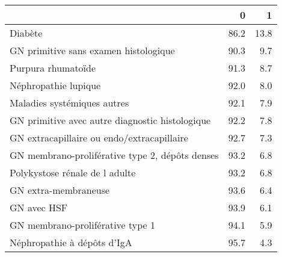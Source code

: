 \documentclass[11pt,a4paper]{article}\usepackage[]{graphicx}\usepackage[]{color}
\begin{document}
\begin{table}[H]
\centering
\begin{tabular}{lrr}
  \hline
 & 0 & 1 \\ 
  \hline
Diabète & 86.2 & 13.8 \\ 
  GN primitive sans examen histologique & 90.3 & 9.7 \\ 
  Purpura rhumatoïde & 91.3 & 8.7 \\ 
  Néphropathie lupique & 92.0 & 8.0 \\ 
  Maladies systémiques autres & 92.1 & 7.9 \\ 
  GN primitive avec autre diagnostic histologique & 92.2 & 7.8 \\ 
  GN extracapillaire ou endo/extracapillaire & 92.7 & 7.3 \\ 
  GN membrano-proliférative type 2, dépôts denses & 93.2 & 6.8 \\ 
  Polykystose rénale de l adulte & 93.2 & 6.8 \\ 
  GN extra-membraneuse & 93.6 & 6.4 \\ 
  GN avec HSF & 93.9 & 6.1 \\ 
  GN membrano-proliférative type 1 & 94.1 & 5.9 \\ 
  Néphropathie à dépôts d'IgA & 95.7 & 4.3 \\ 
   \hline
\end{tabular}
\end{table}
\end{document}
